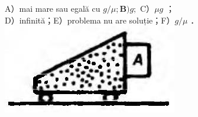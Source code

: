 \documentclass[10pt]{article}
\begin{document}
A）mai mare sau egală cu $g / \mu ; \mathbf{B}) g ;$ C）$\mu g$ ；\\
D）infinită；E）problema nu are soluție；F）$g / \mu$ ．\\
\includegraphics[max width=\textwidth, center]{2025_07_01_5b3ff9fa0d508c8e9f17g-061}
\end{document}
